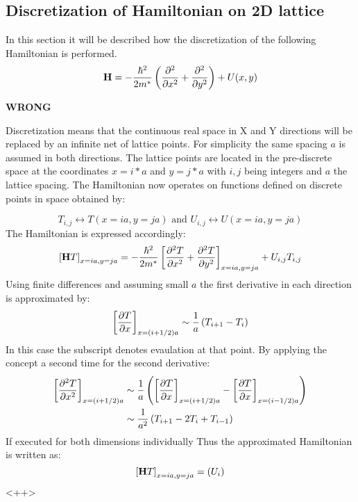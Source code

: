 \subsection{Discretization of Hamiltonian on 2D lattice}
In this section it will be described how the discretization of the following Hamiltonian is performed.
\begin{equation}
  \mathbf{H} = -\frac{\hbar^{2}}{2m^*}\left(\frac{\partial^2 }{\partial x^2}+\frac{\partial^2 }{\partial y^2}\right) + U(x,y)
  \label{FreeHamiltonian}
\end{equation}

\textbf{WRONG}

Discretization means that the continuous real space in X and Y directions will be replaced by an infinite net of lattice points. For simplicity the same spacing $a$ is assumed in both directions. The lattice points are located in the pre-discrete space at the coordinates $x=i*a$ and $y=j*a$ with $i,j$ being integers and $a$ the lattice spacing. The Hamiltonian now operates on functions defined on discrete points in space obtained by:

\begin{equation}
  T_{i,j} \leftrightarrow T(x=ia,y=ja) \mbox{ and } U_{i,j}\leftrightarrow U(x=ia,y=ja)
  \label{FunctionDescrete}
\end{equation}
The Hamiltonian is expressed accordingly:
\begin{equation}
  \left[\mathbf{H}T\right]_{x=ia,y=ja}=-\frac{\hbar^{2}}{2m^*}\left[\frac{\partial^2 T}{\partial x^2}+\frac{\partial^2 T}{\partial y^2}\right]_{x=ia,y=ja}+U_{i,j}T_{i,j}
  \label{DiscreteHamiltonian}
\end{equation}
Using finite differences and assuming small $a$ the first derivative in each direction is approximated by:
\begin{equation}
  \left[\frac{\partial T}{\partial x}\right]_{x=(i+1/2)a} \sim  \frac{1}{a}\left(T_{i+1}-T_{i}\right)
  \label{ApproximateFirstDerivative}
\end{equation}
In this case the subscript denotes evaulation at that point. By applying the concept a second time for the second derivative:
\begin{align}
  \left[\frac{\partial^2 T}{\partial x^2}\right]_{x=(i+1/2)a} &\sim \frac{1}{a}\left( \left[\frac{\partial T}{\partial x}\right]_{x=(i+1/2)a}-\left[\frac{\partial T}{\partial x}\right]_{x=(i-1/2)a} \right) \\
  &\sim \frac{1}{a^2}\left(T_{i+1}-2T_{i}+T_{i-1}\right)
  \label{ApproximateSecondDerivative}
\end{align}
If executed for both dimensions individually Thus the approximated Hamiltonian is written as:
\begin{equation}
  \left[\mathbf{H}T\right]_{x=ia,y=ja}= \left(U_{i}\right)
  \label{<++>}
\end{equation}<++>
